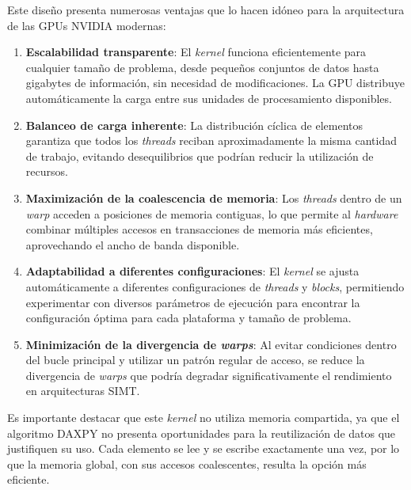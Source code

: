         Este diseño presenta numerosas ventajas que lo hacen idóneo para la arquitectura de las GPUs NVIDIA modernas:
        
        \begin{enumerate}
        
            \item \textbf{Escalabilidad transparente}: El \textit{kernel} funciona eficientemente para cualquier tamaño de problema, desde pequeños conjuntos de datos hasta gigabytes de información, sin necesidad de modificaciones. La GPU distribuye automáticamente la carga entre sus unidades de procesamiento disponibles.
            
            \item \textbf{Balanceo de carga inherente}: La distribución cíclica de elementos garantiza que todos los \textit{threads} reciban aproximadamente la misma cantidad de trabajo, evitando desequilibrios que podrían reducir la utilización de recursos.
            
            \item \textbf{Maximización de la coalescencia de memoria}: Los \textit{threads} dentro de un \textit{warp} acceden a posiciones de memoria contiguas, lo que permite al \textit{hardware} combinar múltiples accesos en transacciones de memoria más eficientes, aprovechando el ancho de banda disponible.
            
            \item \textbf{Adaptabilidad a diferentes configuraciones}: El \textit{kernel} se ajusta automáticamente a diferentes configuraciones de \textit{threads} y \textit{blocks}, permitiendo experimentar con diversos parámetros de ejecución para encontrar la configuración óptima para cada plataforma y tamaño de problema.
            
            \item \textbf{Minimización de la divergencia de \textit{warps}}: Al evitar condiciones dentro del bucle principal y utilizar un patrón regular de acceso, se reduce la divergencia de \textit{warps} que podría degradar significativamente el rendimiento en arquitecturas SIMT.
            
        \end{enumerate}
        
        Es importante destacar que este \textit{kernel} no utiliza memoria compartida, ya que el algoritmo DAXPY no presenta oportunidades para la reutilización de datos que justifiquen su uso. Cada elemento se lee y se escribe exactamente una vez, por lo que la memoria global, con sus accesos coalescentes, resulta la opción más eficiente.

